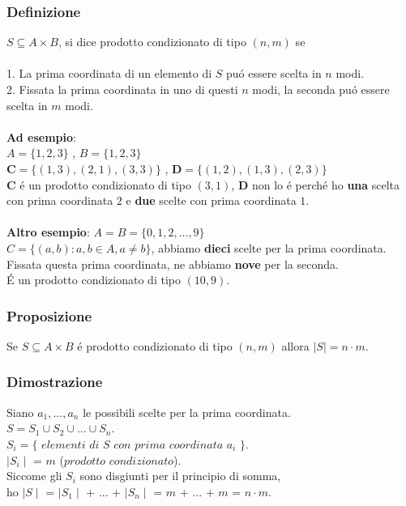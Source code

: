\documentclass[11pt]{article}
\begin{document}
            \subsubsection{Definizione}
            $S \subseteq A\times B$, si dice prodotto condizionato di tipo $(n,m)$ se \\
            \\
            1. La prima coordinata di un elemento di $S$ pu\'o essere scelta in $n$ modi.\\
            2. Fissata la prima coordinata in uno di questi $n$ modi, la seconda pu\'o essere scelta in $m$ modi.\\
            \\
            \textbf{Ad esempio}:\\
            $A=\{1,2,3\}$ , $B=\{1,2,3\}$ \\
            $\textbf{C}=\{(1,3),(2,1),(3,3)\}$ , $\textbf{D}=\{(1,2),(1,3),(2,3)\}$\\
            \textbf{C} \'e un prodotto condizionato di tipo $(3,1)$, \textbf{D} non lo \'e perch\'e ho \textbf{una} scelta con prima coordinata $2$ e \textbf{due} scelte con prima coordinata $1$.\\
            \\ \textbf{Altro esempio}:
            $A=B=\{0,1,2,...,9\}$\\
            $C=\{(a,b):a,b \in A, a \neq b\}$, abbiamo \textbf{dieci} scelte per la prima coordinata. Fissata questa prima coordinata, ne abbiamo \textbf{nove} per la seconda.\\
            \'E un prodotto condizionato di tipo $(10,9)$.
            \subsubsection{Proposizione}
            Se $S \subseteq A \times B$ \'e prodotto condizionato di tipo $(n,m)$ allora $\mid S \mid = n \cdot m$.
            \subsubsection{Dimostrazione}
            Siano $a_1,...,a_n$ le possibili scelte per la prima coordinata.\\
            $S=S_1 \cup S_2 \cup ... \cup S_n$.\\
            $S_i = \{$ $elementi$ $di$ $S$ $con$ $prima$ $coordinata$ $a_i$ $\}$.\\
            $\mid S_i \mid$ = $m$ ($prodotto$ $condizionato$).\\
            Siccome gli $S_i$ sono disgiunti per il principio di somma, \\
            ho $\mid S \mid$ = $\mid S_1 \mid$ + ... + $\mid S_n \mid$ = $m$ + $...$ + $m$ = $n \cdot m$.
\end{document}
